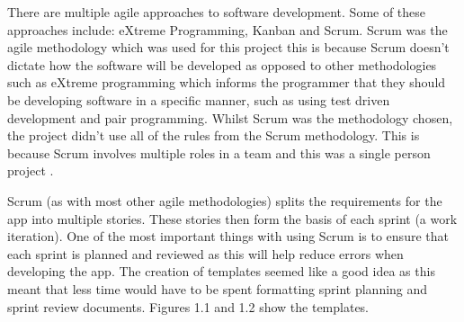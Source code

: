 There are multiple agile approaches to software development. Some of these approaches include: eXtreme Programming, Kanban and Scrum. Scrum was the agile methodology which was used for this project this is because Scrum doesn't dictate how the  software will be developed as opposed to other methodologies such as eXtreme programming which informs the programmer that they should be developing software in a specific manner, such as using test driven development and pair programming. Whilst Scrum was the methodology chosen, the project didn't use all of the rules from the Scrum methodology. This is because Scrum involves multiple roles in a team and this was a single person project \cite{ask}. 

Scrum (as with most other agile methodologies) splits the requirements for the app into multiple stories. These stories then form the basis of each sprint (a work iteration)\cite{sg}. One of the most important things with using Scrum is to ensure that each sprint is planned and reviewed as this will help reduce errors when developing the app. The creation of templates seemed like a good idea as this meant that less time would have to be spent formatting sprint planning and sprint review documents. Figures 1.1 and 1.2 show the templates.

